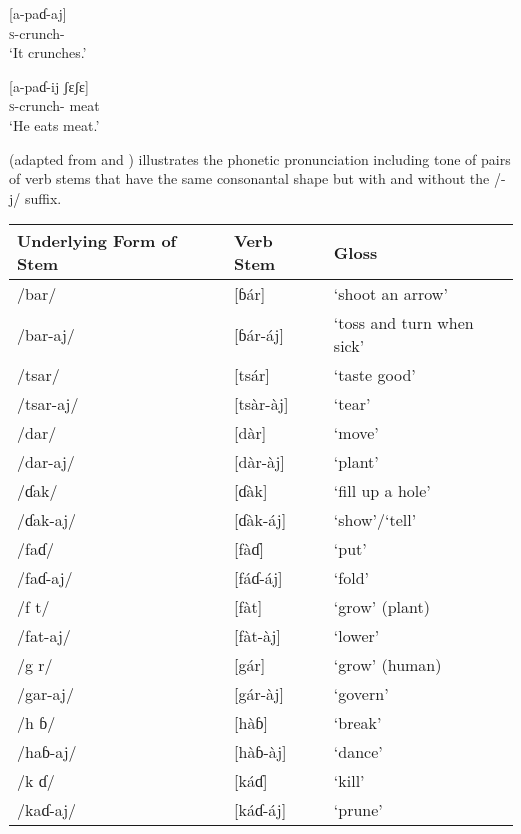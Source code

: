 \ea \label{ex:6:7}
\textup{[a-paɗ-aj]}\\
      \textsc{s}-crunch{}-{\CL}\\
\glt  ‘It crunches.’
\z

\largerpage
\ea \label{ex:6:8}
\textup{[a-paɗ-ij  ʃɛʃɛ]}\\
      \textsc{s}-crunch-{\CL}  meat\\
\glt  ‘He eats meat.’
\z

 (adapted from \citealt{Bow1997c} and \citealt{Boyd2003}) illustrates the phonetic pronunciation including tone of pairs of verb stems that have the same consonantal shape but with and without the /-j/ suffix.

\begin{table}
\begin{tabular}{lll}
\lsptoprule

{Underlying Form of Stem} & {Verb Stem} & {Gloss}\\\midrule
/bar/ & [ɓár] & ‘shoot an arrow’\\
/bar-aj/ & [ɓár-áj] & ‘toss and turn when sick’\\

/tsar/ & [tsár] & ‘taste good’\\
/tsar-aj/ & [tsàr-àj] & ‘tear’\\

/dar/ & [dàr] & ‘move’ \\
/dar-aj/ & [dàr-àj] & ‘plant’\\

/ɗak/ & [ɗàk] & ‘fill up a hole’\\
/ɗak-aj/ & [ɗàk-áj] & ‘show’/‘tell’\\

/faɗ/ & [fàɗ] & ‘put’\\
/faɗ-aj/ & [fáɗ-áj] & ‘fold’\\

/f t/ & [fàt] & ‘grow’ (plant)\\
/fat-aj/ & [fàt-àj] & ‘lower’\\

/g r/ & [gár] & ‘grow’ (human)\\
/gar-aj/ & [gár-àj] & ‘govern’\\

/h ɓ/ & [hàɓ] & ‘break’\\
/haɓ-aj/ & [hàɓ-àj] & ‘dance’\\

/k ɗ/ & [káɗ] & ‘kill’\\
/kaɗ-aj/ & [káɗ-áj] & ‘prune’\\


\end{tabular}
\end{table}
